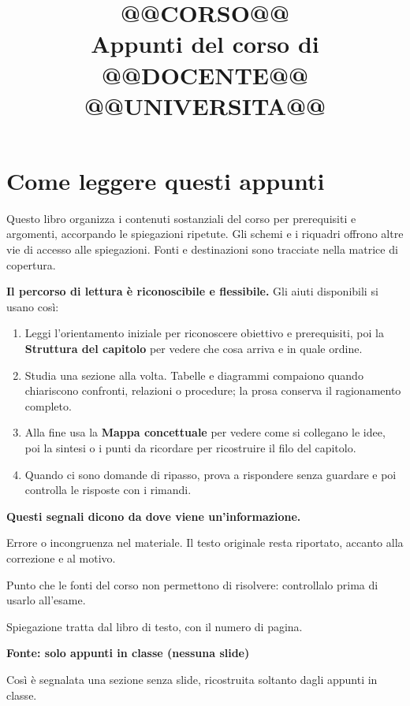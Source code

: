 \documentclass[12pt,a4paper,openany]{book}
\title{\Huge\bfseries @@CORSO@@\\[0.6em]\Large\mdseries Appunti del corso di @@DOCENTE@@\\ @@UNIVERSITA@@}
\author{}
\date{}
\newcommand{\soloappunti}{\par\textcolor{fonte}{\bfseries Fonte: solo appunti in classe (nessuna slide)}\par}
\begin{document}
\frontmatter
\maketitle

\chapter*{Come leggere questi appunti}
Questo libro organizza i contenuti sostanziali del corso per prerequisiti e argomenti, accorpando le spiegazioni ripetute. Gli schemi e i riquadri offrono altre vie di accesso alle spiegazioni. Fonti e destinazioni sono tracciate nella matrice di copertura.

\textbf{Il percorso di lettura è riconoscibile e flessibile.} Gli aiuti disponibili si usano così:

\begin{enumerate}
\item Leggi l'orientamento iniziale per riconoscere obiettivo e prerequisiti, poi la \textbf{Struttura del capitolo} per vedere che cosa arriva e in quale ordine.
\item Studia una sezione alla volta. Tabelle e diagrammi compaiono quando chiariscono confronti, relazioni o procedure; la prosa conserva il ragionamento completo.
\item Alla fine usa la \textbf{Mappa concettuale} per vedere come si collegano le idee, poi la sintesi o i punti da ricordare per ricostruire il filo del capitolo.
\item Quando ci sono domande di ripasso, prova a rispondere senza guardare e poi controlla le risposte con i rimandi.
\end{enumerate}

\textbf{Questi segnali dicono da dove viene un'informazione.}

\begin{correzione}
Errore o incongruenza nel materiale. Il testo originale resta riportato, accanto alla correzione e al motivo.
\end{correzione}
\begin{dubbio}
Punto che le fonti del corso non permettono di risolvere: controllalo prima di usarlo all'esame.
\end{dubbio}
\begin{dallibro}
Spiegazione tratta dal libro di testo, con il numero di pagina.
\end{dallibro}
\soloappunti
Così è segnalata una sezione senza slide, ricostruita soltanto dagli appunti in classe.
\end{document}
